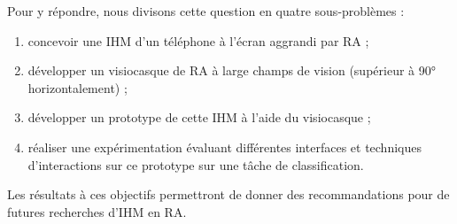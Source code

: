 Pour y répondre, nous divisons cette question en quatre sous-problèmes :
\begin{enumerate}
  \item concevoir une IHM d'un téléphone à l'écran aggrandi par RA ;
  \item développer un visiocasque de RA à large champs de vision (supérieur à 90° horizontalement) ;
  \item développer un prototype de cette IHM à l'aide du visiocasque ;
  \item réaliser une expérimentation évaluant différentes interfaces et techniques d'interactions sur ce prototype sur une tâche de classification.
\end{enumerate}

Les résultats à ces objectifs permettront de donner des recommandations pour de futures recherches d'IHM en RA.